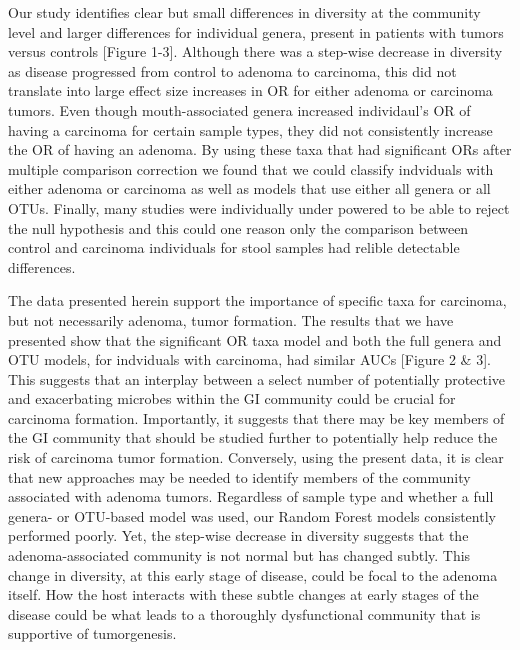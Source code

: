 \documentclass[12pt,]{article}
\begin{document}
Our study identifies clear but small differences in diversity at the
community level and larger differences for individual genera, present in
patients with tumors versus controls {[}Figure 1-3{]}. Although there
was a step-wise decrease in diversity as disease progressed from control
to adenoma to carcinoma, this did not translate into large effect size
increases in OR for either adenoma or carcinoma tumors. Even though
mouth-associated genera increased individaul's OR of having a carcinoma
for certain sample types, they did not consistently increase the OR of
having an adenoma. By using these taxa that had significant ORs after
multiple comparison correction we found that we could classify
indviduals with either adenoma or carcinoma as well as models that use
either all genera or all OTUs. Finally, many studies were individually
under powered to be able to reject the null hypothesis and this could
one reason only the comparison between control and carcinoma individuals
for stool samples had relible detectable differences.

The data presented herein support the importance of specific taxa for
carcinoma, but not necessarily adenoma, tumor formation. The results
that we have presented show that the significant OR taxa model and both
the full genera and OTU models, for indviduals with carcinoma, had
similar AUCs {[}Figure 2 \& 3{]}. This suggests that an interplay
between a select number of potentially protective and exacerbating
microbes within the GI community could be crucial for carcinoma
formation. Importantly, it suggests that there may be key members of the
GI community that should be studied further to potentially help reduce
the risk of carcinoma tumor formation. Conversely, using the present
data, it is clear that new approaches may be needed to identify members
of the community associated with adenoma tumors. Regardless of sample
type and whether a full genera- or OTU-based model was used, our Random
Forest models consistently performed poorly. Yet, the step-wise decrease
in diversity suggests that the adenoma-associated community is not
normal but has changed subtly. This change in diversity, at this early
stage of disease, could be focal to the adenoma itself. How the host
interacts with these subtle changes at early stages of the disease could
be what leads to a thoroughly dysfunctional community that is supportive
of tumorgenesis.
\end{document}
